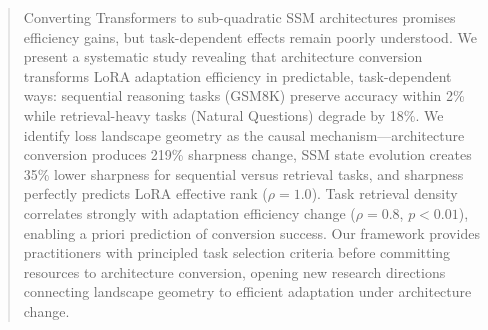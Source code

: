 \begin{abstract}
Converting Transformers to sub-quadratic SSM architectures promises efficiency gains, but task-dependent effects remain poorly understood. We present a systematic study revealing that architecture conversion transforms LoRA adaptation efficiency in predictable, task-dependent ways: sequential reasoning tasks (GSM8K) preserve accuracy within 2\% while retrieval-heavy tasks (Natural Questions) degrade by 18\%. We identify loss landscape geometry as the causal mechanism---architecture conversion produces 219\% sharpness change, SSM state evolution creates 35\% lower sharpness for sequential versus retrieval tasks, and sharpness perfectly predicts LoRA effective rank ($\rho=1.0$). Task retrieval density correlates strongly with adaptation efficiency change ($\rho=0.8$, $p<0.01$), enabling a priori prediction of conversion success. Our framework provides practitioners with principled task selection criteria before committing resources to architecture conversion, opening new research directions connecting landscape geometry to efficient adaptation under architecture change.
\end{abstract}
